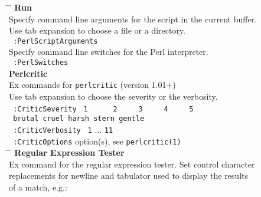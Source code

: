 \documentclass[oneside,10pt,landscape,DIV17]{scrartcl}
\begin{document}
\begin{multicols}{2}
\parbox[t][70mm][t]{120mm}{%
%
\begin{tabbing}
\hspace{30mm} \= \hspace{50mm} \= \kill
%
%
\large{\textbf{Run}}\\[1.0ex]
%
Specify command line arguments for the script in the current buffer.\\
Use tab expansion to choose a file or a directory.\\[1.0ex]
%
\texttt{ :PerlScriptArguments}  \> \\[1.0ex]
%
Specify command line switches for the Perl interpreter.\\[1.0ex]
%
\texttt{ :PerlSwitches}  \> \\[2.5ex]
%
%
\large{\textbf{Perlcritic}}\\[1.0ex]
%
Ex commands for \texttt{perlcritic} (version 1.01+)\\
Use tab expansion to choose the severity or the verbosity.\\[2.0ex]
\texttt{ :CriticSeverity}  \> \texttt{\ 1\ \ \ \ \ \ 2\ \ \ \ \ 3\ \ \ \ \ 4\ \ \ \ \ 5} \\
                           \> \texttt{\ brutal cruel harsh stern gentle} \\[1.0ex]
\texttt{ :CriticVerbosity} \> \texttt{\ 1} $\ldots$ \texttt{11}\\[1.0ex]
\texttt{ :CriticOptions}   \> option(s), see \texttt{perlcritic(1)}\\[2.5ex]
%
\hspace{40mm} \= \hspace{50mm} \= \kill
\large{\textbf{Regular Expression Tester}}\\[1.0ex]
%
Ex command for the regular expression tester. Set control character\\
replacements for newline and tabulator used to display the results\\
of a match, e.g.:\\[1.0ex]


\end{tabbing}}
\end{multicols}
\end{document}
